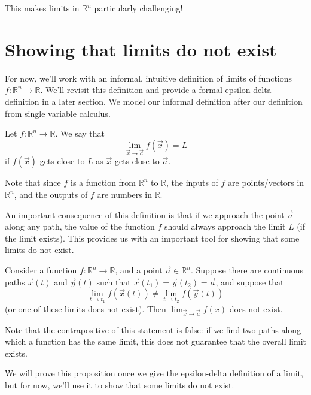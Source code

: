 \documentclass{ximera}
\begin{document}

This makes limits in $\mathbb{R}^n$ particularly challenging!

\section*{Showing that limits do not exist}

For now, we'll work with an informal, intuitive definition of limits of functions $f:\mathbb{R}^n\rightarrow\mathbb{R}$. We'll revisit this definition and provide a formal epsilon-delta definition in a later section. We model our informal definition after our definition from single variable calculus.

\begin{definition}
Let $f:\mathbb{R}^n\rightarrow \mathbb{R}$. We say that
\[
\lim_{\vec{x}\rightarrow\vec{a}}f(\vec{x})=L
\]
if $f(\vec{x})$ gets close to $L$ as $\vec{x}$ gets close to $\vec{a}$.
\end{definition}

Note that since $f$ is a function from $\mathbb{R}^n$ to $\mathbb{R}$, the inputs of $f$ are points/vectors in $\mathbb{R}^n$, and the outputs of $f$ are numbers in $\mathbb{R}$.

An important consequence of this definition is that if we approach the point $\vec{a}$ along any path, the value of the function $f$ should always approach the limit $L$ (if the limit exists). This provides us with an important tool for showing that some limits do not exist.

\begin{proposition}
Consider a function $f:\mathbb{R}^n\rightarrow \mathbb{R}$, and a point $\vec{a}\in\mathbb{R}^n$. Suppose there are continuous paths $\vec{x}(t)$ and $\vec{y}(t)$ such that $\vec{x}(t_1) = \vec{y}(t_2) = \vec{a}$, and suppose that
\[
\lim_{t\rightarrow t_1}f(\vec{x}(t))\neq \lim_{t\rightarrow t_2}f(\vec{y}(t))
\]
(or one of these limits does not exist). Then $\lim_{\vec{x}\rightarrow\vec{a}}f(x)$ does not exist.
\end{proposition}

Note that the contrapositive of this statement is false: if we find two paths along which a function has the same limit, this does not guarantee that the overall limit exists.

We will prove this proposition once we give the epsilon-delta definition of a limit, but for now, we'll use it to show that some limits do not exist.
\end{document}
